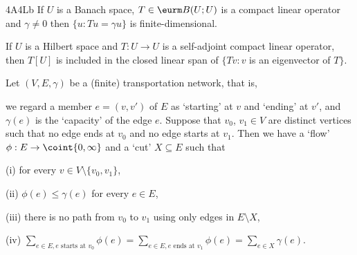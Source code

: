 \spheader 4A4Lb If $U$ is a Banach space, $T\in\eurm B(U;U)$ is a
compact linear operator and $\gamma\ne 0$ then
$\{u:Tu=\gamma u\}$ is finite-dimensional.

 If $U$ is a
Hilbert space and $T:U\to U$ is a
self-adjoint compact linear operator, then $T[U]$ is included in
the closed linear span of $\{Tv:v$ is an eigenvector of $T\}$.

 Let $(V,E,\gamma)$ be a (finite) transportation network, that is,


\noindent we regard a member $e=(v,v')$ of $E$ as `starting' at $v$ and
`ending' at $v'$, and $\gamma(e)$ is the `capacity' of the edge $e$.
Suppose that $v_0$, $v_1\in V$ are distinct vertices
such that no edge ends at $v_0$ and no edge starts at $v_1$.
Then we have a `flow' $\phi:E\to\coint{0,\infty}$ and a `cut'
$X\subseteq E$ such that

(i) for every $v\in V\setminus\{v_0,v_1\}$,


(ii) $\phi(e)\le\gamma(e)$ for every $e\in E$,

(iii) there is no path from $v_0$ to $v_1$ using only edges in
$E\setminus X$,

(iv) $\sum_{e\in E,e\text{ starts at }v_0}\phi(e)
=\sum_{e\in E,e\text{ ends at }v_1}\phi(e)
=\sum_{e\in X}\gamma(e)$.


\discrpage

